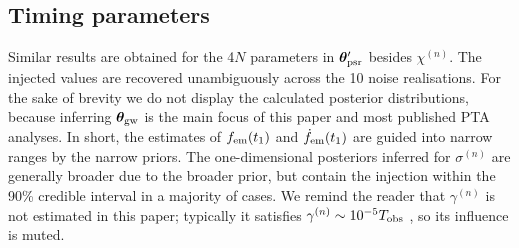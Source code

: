 \documentclass[fleqn,usenatbib,useAMS]{mnras}
\begin{document}
\subsection{Timing parameters} \label{sec:timing_parameters}
Similar results are obtained for the 4$N$ parameters in $\boldsymbol{\theta}_{\rm psr}'$ besides $\chi^{(n)}$. The injected values are recovered unambiguously across the 10 noise realisations. For the sake of brevity we do not display the calculated posterior distributions, because inferring $\boldsymbol{\theta}_{\rm gw}$ is the main focus of this paper and most published PTA analyses. In short, the estimates of $f_{\rm em}(t_1)$ and $\dot{f}_{\rm em}(t_1)$ are guided into narrow ranges by the narrow priors. The one-dimensional posteriors inferred for $\sigma^{(n)}$ are generally broader due to the broader prior, but contain the injection within the  90\% credible interval in a majority of cases. We remind the reader that $\gamma^{(n)}$ is not estimated in this paper; typically it satisfies $\gamma^{(n)} \sim 10^{-5} T_{\rm obs}$ \citep{Price2012,Myers2021MNRAS.502.3113M,Meyers2021,Vargas}, so its influence is muted. \newline 



  
\end{document}
